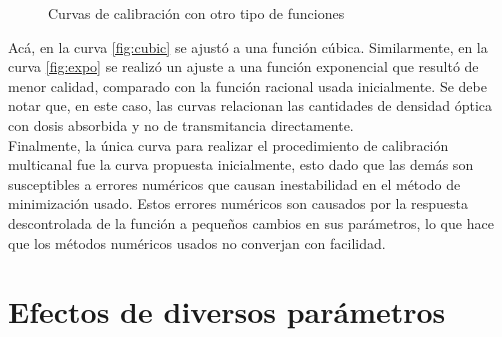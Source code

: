 \begin{figure}[H]
	\centering
	\hfill
	\caption{Curvas de calibración con otro tipo de funciones}
	\label{fig:CurvasAdicionales}
\end{figure}

Acá, en la curva \ref{fig:cubic} se ajustó a una función cúbica. Similarmente, en la curva \ref{fig:expo} se realizó un ajuste a una función exponencial que resultó de menor calidad, comparado con la función racional usada inicialmente. Se debe notar que, en este caso, las curvas relacionan las cantidades  de densidad óptica con dosis absorbida y no de transmitancia directamente.\\

Finalmente, la única curva para realizar el  procedimiento de calibración multicanal fue la curva propuesta inicialmente, esto dado que las demás son susceptibles a errores numéricos que causan inestabilidad en el método de minimización usado. Estos errores numéricos son causados por la respuesta descontrolada de la función a pequeños cambios en sus parámetros, lo que hace que los métodos numéricos usados no converjan con facilidad.


\section{Efectos de diversos parámetros}

